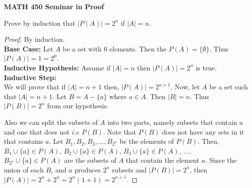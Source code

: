 \documentclass[14pt]{article}
\begin{document}
\begin{center}
		
{\bf MATH 450 Seminar in Proof}
 \\
\end{center}
	Prove by induction that $|P(A)| = 2^n$ if $|A| = n$.\\
\begin{proof}
	 By induction. \\
	
	\textbf{Base Case:} Let $A$ be a set with 0 elements. Then the $P(A) = \{ \emptyset \}$. Thus $|P(A)| = 1 = 2^0$.\\
	\textbf{Inductive Hypothesis:} Assume if $|A| = n$ then $|P(A)| = 2^n$ is true.
	\textbf{Inductive Step:}
	\\ We will prove that if $|A| = n+1$ then, $|P(A)| = 2^{n+1}$. Now, let $A$ be a set such that $|A| = n+1$. Let $B = A - \{a\}$ where $a \in A$. Then $|B| = n$. Thus $|P(B)| = 2^n$ from our hypothesis.
	
	 Also we can split the subsets of $A$ into two parts, namely subsets that contain $a$ and one that does not $i.e$ $P(B)$. Note that $P(B)$ does not have any sets in it that contains $a$. Let $B_1, B_2, B_3,...,B_{2^n}$ be the elements of $P(B)$. Then, $B_1 \cup \{a\} \in P(A)$, $B_2 \cup \{a\} \in P(A)$, $B_3 \cup \{a\} \in P(A)$, ..., $B_{2^n} \cup \{a\} \in P(A)$ are the subsets of $A$ that contain the element $a$. Since the union of each $B_i$ and $a$ produces $2^n$ subsets and $|P(B)| =2^n$, then $|P(A)| = 2^n + 2^n = 2^n(1+1) = 2^{n+1}$. 
\end{proof}
\end{document}
